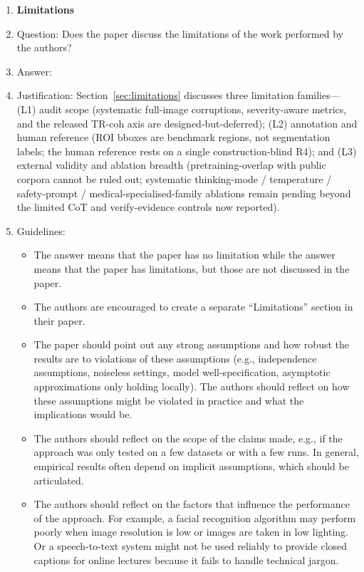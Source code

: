 \begin{enumerate}
\item {\bf Limitations}
    \item[] Question: Does the paper discuss the limitations of the work performed by the authors?
    \item[] Answer: \answerYes{}
    \item[] Justification: Section~\ref{sec:limitations} discusses three limitation families---(L1) audit scope (systematic full-image corruptions, severity-aware metrics, and the released TR-coh axis are designed-but-deferred); (L2) annotation and human reference (ROI bboxes are benchmark regions, not segmentation labels; the human reference rests on a single construction-blind \textsc{R4}); and (L3) external validity and ablation breadth (pretraining-overlap with public corpora cannot be ruled out; systematic thinking-mode / temperature / safety-prompt / medical-specialised-family ablations remain pending beyond the limited CoT and verify-evidence controls now reported).
    \item[] Guidelines:
    \begin{itemize}
        \item The answer \answerNA{} means that the paper has no limitation while the answer \answerNo{} means that the paper has limitations, but those are not discussed in the paper.
        \item The authors are encouraged to create a separate ``Limitations'' section in their paper.
        \item The paper should point out any strong assumptions and how robust the results are to violations of these assumptions (e.g., independence assumptions, noiseless settings, model well-specification, asymptotic approximations only holding locally). The authors should reflect on how these assumptions might be violated in practice and what the implications would be.
        \item The authors should reflect on the scope of the claims made, e.g., if the approach was only tested on a few datasets or with a few runs. In general, empirical results often depend on implicit assumptions, which should be articulated.
        \item The authors should reflect on the factors that influence the performance of the approach. For example, a facial recognition algorithm may perform poorly when image resolution is low or images are taken in low lighting. Or a speech-to-text system might not be used reliably to provide closed captions for online lectures because it fails to handle technical jargon.

\end{itemize}
\end{enumerate}
